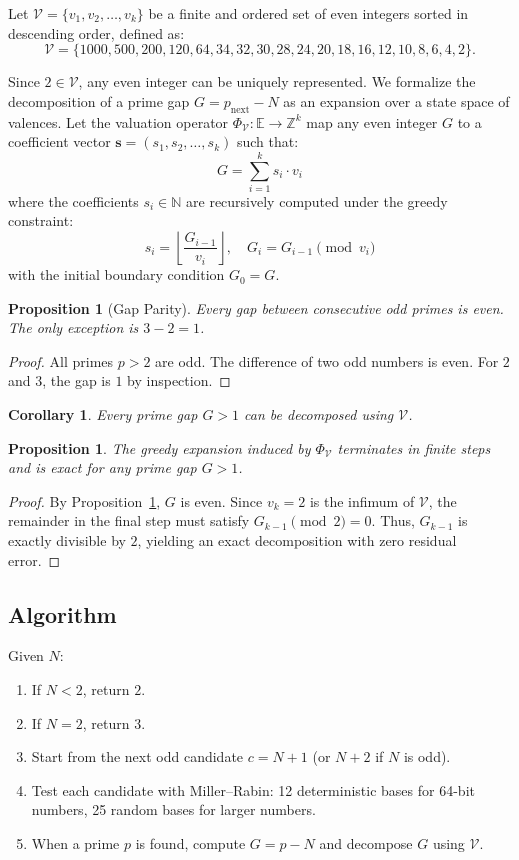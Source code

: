 \documentclass[12pt,a4paper]{article}
\theoremstyle{plain}
\newtheorem{proposition}[theorem]{Proposition}
\newtheorem{corollary}[theorem]{Corollary}
\begin{document}
Let $\mathcal{V} = \{v_1, v_2, \dots, v_k\}$ be a finite and ordered set of even integers sorted in descending order, defined as:
\[
\mathcal{V} = \{1000, 500, 200, 120, 64, 34, 32, 30, 28, 24,
20, 18, 16, 12, 10, 8, 6, 4, 2\}.
\]

Since $2 \in \mathcal{V}$, any even integer can be uniquely represented. We formalize the decomposition of a prime gap $G = p_{\text{next}} - N$ as an expansion over a state space of valences. Let the valuation operator $\Phi_{\mathcal{V}}: \mathbb{E} \to \mathbb{Z}^k$ map any even integer $G$ to a coefficient vector $\mathbf{s} = (s_1, s_2, \dots, s_k)$ such that:
\[
G = \sum_{i=1}^{k} s_i \cdot v_i
\]
where the coefficients $s_i \in \mathbb{N}$ are recursively computed under the greedy constraint:
\[
s_i = \left\lfloor \frac{G_{i-1}}{v_i} \right\rfloor,\quad
G_i = G_{i-1} \pmod{v_i}
\]
with the initial boundary condition $G_0 = G$.

\begin{proposition}[Gap Parity]
\label{prop:parity}
Every gap between consecutive odd primes is even.
The only exception is $3-2=1$.
\end{proposition}
\begin{proof}
All primes $p>2$ are odd. The difference of two odd numbers is even.
For $2$ and $3$, the gap is $1$ by inspection.
\end{proof}

\begin{corollary}
\label{coro:decomp}
Every prime gap $G>1$ can be decomposed using $\mathcal{V}$.
\end{corollary}

\begin{proposition}
\label{prop:greedy}
The greedy expansion induced by $\Phi_{\mathcal{V}}$ terminates in
finite steps and is exact for any prime gap $G > 1$.
\end{proposition}
\begin{proof}
By Proposition~\ref{prop:parity}, $G$ is even. Since
$v_k = 2$ is the infimum of $\mathcal{V}$, the remainder in the
final step must satisfy $G_{k-1} \pmod 2 = 0$. Thus,
$G_{k-1}$ is exactly divisible by $2$, yielding an
exact decomposition with zero residual error.
\end{proof}

\subsection{Algorithm}
\label{sec:algo}

Given $N$:
\begin{enumerate}
  \item If $N<2$, return $2$.
  \item If $N=2$, return $3$.
  \item Start from the next odd candidate $c=N+1$ (or $N+2$ if
    $N$ is odd).
  \item Test each candidate with Miller--Rabin: 12 deterministic
    bases for 64-bit numbers, 25 random bases for larger numbers.
  \item When a prime $p$ is found, compute $G=p-N$ and decompose
    $G$ using $\mathcal{V}$.
\end{enumerate}
\end{document}
